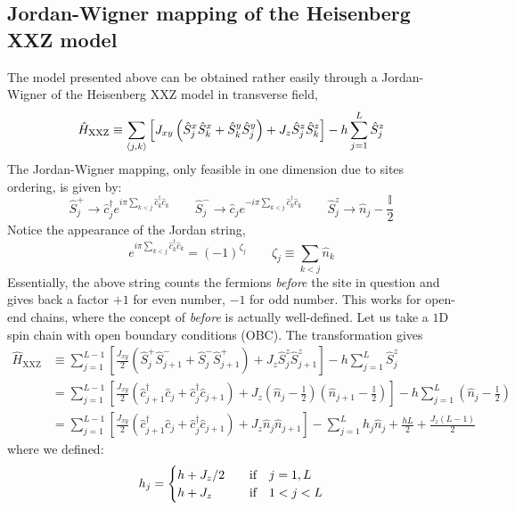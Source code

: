 \subsection{Jordan-Wigner mapping of the Heisenberg XXZ model}

The model presented above can be obtained rather easily through a Jordan-Wigner of the Heisenberg XXZ model in transverse field,
\begin{equation}\label{eq:xxz-hamiltonian}
	\hat H_\mathrm{XXZ} \equiv \sum_{\ev{j,k}} \left[
		J_{xy} \left( 
			\hat S_j^x \hat S_k^x + \hat S_k^y \hat S_j^y
		\right) + J_z \hat S_j^z \hat S_k^z
	\right] - h \sum_{j=1}^L \hat S_j^z 
\end{equation}
The Jordan-Wigner mapping, only feasible in one dimension due to sites ordering, is given by:
\[
	\hat S_j^+ \to \hat c_j^\dagger e^{i\pi \sum_{k < j} \hat c_k^\dagger \hat c_k}
	\qquad
	\hat S_j^- \to \hat c_j e^{- i\pi \sum_{k < j} \hat c_k^\dagger \hat c_k}
	\qquad
	\hat S_j^z \to \hat n_j - \frac{\mathbb{I}}{2}
\]
Notice the appearance of the Jordan string,
\[
	e^{i\pi \sum_{k < j} \hat c_k^\dagger \hat c_k} = (-1)^{\zeta_j}
	\qquad
	\zeta_j \equiv \sum_{k < j} \hat n_k
\]
Essentially, the above string counts the fermions \textit{before} the site in question and gives back a factor $+1$ for even number, $-1$ for odd number. This works for open-end chains, where the concept of \textit{before} is actually well-defined. Let us take a $1\mathrm{D}$ spin chain with open boundary conditions (OBC). The transformation gives
\[
	\begin{aligned}
		\hat H_\mathrm{XXZ} &\equiv \sum_{j=1}^{L-1} \left[
			\frac{J_{xy}}{2} \left( 
				\hat S_j^+ \hat S_{j+1}^- + \hat S_j^- \hat S_{j+1}^+
			\right) + J_z \hat S_j^z \hat S_{j+1}^z
		\right] - h \sum_{j=1}^L \hat S_j^z \\
		&= \sum_{j=1}^{L-1} \left[
			\frac{J_{xy}}{2} \left(
				\hat c_{j+1}^\dagger \hat c_j + \hat c_j^\dagger \hat c_{j+1}
			\right) + J_z \left(
				\hat n_j - \frac{\mathbb{I}}{2}
			\right) \left(
				\hat n_{j+1} - \frac{\mathbb{I}}{2}
			\right)
		\right] - h \sum_{j=1}^L \left(
			\hat n_{j} - \frac{\mathbb{I}}{2}
		\right) \\
		&= \sum_{j=1}^{L-1} \left[
			\frac{J_{xy}}{2} \left(
				\hat c_{j+1}^\dagger \hat c_j + \hat c_j^\dagger \hat c_{j+1}
			\right) + J_z \hat n_j \hat n_{j+1}
		\right] - \sum_{j=1}^L h_j \hat n_{j}
		+ \frac{hL}{2} + \frac{J_z (L-1)}{2}
	\end{aligned}
\]
where we defined:
\[
	h_j = \begin{cases}
		h + J_z/2 &\qq{if} j=1,L \\
		h + J_z &\qq{if} 1<j<L
	\end{cases}
\]
